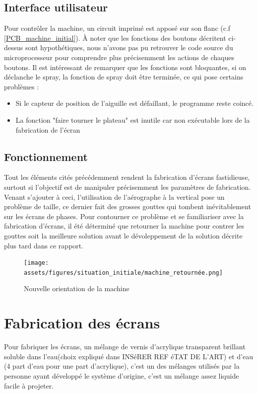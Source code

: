\newpage
\subsection{Interface utilisateur}
Pour contrôler la machine, un circuit imprimé est apposé sur son flanc (c.f \autoref{PCB_machine_initial}).
À noter que les fonctions des boutons décritent ci-dessus sont hypothétiques, nous n'avons pas pu retrouver le code
source du microprocesseur pour comprendre plus précisemment les actions de chaques boutons. Il est intéressant de remarquer
que les fonctions sont bloquantes, si on déclanche le spray, la fonction de spray doit être terminée, ce qui pose certains problèmes :

\begin{itemize}
  \item Si le capteur de position de l'aiguille est défaillant, le programme reste coincé.
  \item La fonction "faire tourner le plateau" est inutile car non exécutable lors de la fabrication de l'écran
\end{itemize}

\subsection{Fonctionnement}

Tout les éléments cités précédemment rendent la fabrication d'écrans fastidieuse, surtout si l'objectif est de manipuler précisemment les paramètres de fabrication.
Venant s'ajouter à ceci, l'utilisation de l'aérographe à la vertical pose un problème de taille, ce dernier fait des grosses gouttes qui tombent inévitablement sur
les écrans de phases. Pour contourner ce problème et se familiariser avec la fabrication d'écrans, il été déterminé que retourner la machine pour contrer les gouttes
soit la meilleure solution avant le dévoleppement de la solution décrite plus tard dans ce rapport.

\begin{figure}[H]
  \centering
  \texttt{[image: assets/figures/situation\_initiale/machine\_retournée.png]}
  \caption{Nouvelle orientation de la machine}
\end{figure}

\newpage
\section{Fabrication des écrans}
Pour fabriquer les écrans, un mélange de vernis d'acrylique transparent brillant soluble dans l'eau(choix expliqué dans \color{red}INSéRER REF éTAT DE L'ART\color{black}) et d'eau (4 part d'eau pour une part d'acrylique),
c'est un des mélanges utilisés par la personne ayant développé le système d'origine, c'est un mélange assez liquide facile à projeter.

